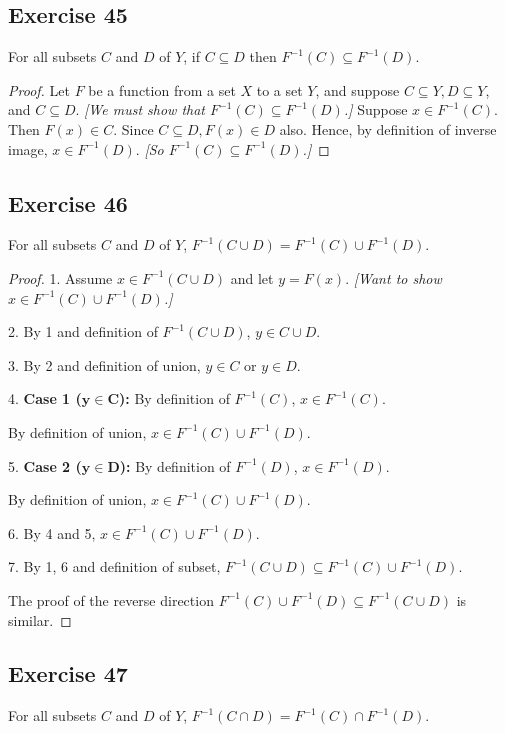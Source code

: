 \documentclass[14pt]{extarticle}
\begin{document}
\subsection{Exercise 45}
For all subsets $C$ and $D$ of $Y$, if \(C \subseteq D\) then \(F^{-1}(C) \subseteq F^{-1}(D)\).

\begin{proof}
    Let $F$ be a function from a set $X$ to a set $Y$, and suppose \(C \subseteq Y, D \subseteq Y\), and
    \(C \subseteq D\). {\it [We must show that \(F^{-1}(C) \subseteq F^{-1}(D)\).]} Suppose \(x \in F^{-1}(C)\). Then
    \(F(x) \in C\). Since \(C \subseteq D, F(x) \in D\) also. Hence, by definition of inverse image, \(x \in F^{-1}(D)\).
        {\it [So \(F^{-1}(C) \subseteq F^{-1}(D)\).]}
\end{proof}

\subsection{Exercise 46}
For all subsets $C$ and $D$ of $Y$, \(F^{-1}(C \cup D) = F^{-1}(C) \cup F^{-1}(D)\).

\begin{proof}
    1. Assume \(x \in F^{-1}(C \cup D)\) and let $y = F(x)$. {\it [Want to show \(x \in F^{-1}(C) \cup F^{-1}(D)\).]}

    2. By 1 and definition of \(F^{-1}(C \cup D)\), \(y \in C \cup D\).

    3. By 2 and definition of union, \(y \in C\) or \(y \in D\).

    4. {\bf Case 1 (\(\bm{y \in C}\)):} By definition of \(F^{-1}(C)\), \(x \in F^{-1}(C)\).

    By definition of union, \(x \in F^{-1}(C) \cup F^{-1}(D)\).

    5. {\bf Case 2 (\(\bm{y \in D}\)):} By definition of \(F^{-1}(D)\), \(x \in F^{-1}(D)\).

    By definition of union, \(x \in F^{-1}(C) \cup F^{-1}(D)\).

    6. By 4 and 5, \(x \in F^{-1}(C) \cup F^{-1}(D)\).

    7. By 1, 6 and definition of subset, \(F^{-1}(C \cup D) \subseteq F^{-1}(C) \cup F^{-1}(D)\).

    The proof of the reverse direction \(F^{-1}(C) \cup F^{-1}(D) \subseteq F^{-1}(C \cup D)\) is similar.
\end{proof}

\subsection{Exercise 47}
For all subsets $C$ and $D$ of $Y$, \(F^{-1}(C \cap D) = F^{-1}(C) \cap F^{-1}(D)\).
\end{document}
